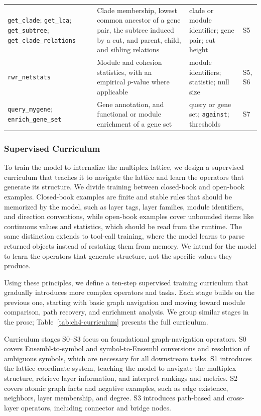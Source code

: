 \begin{table}[htb!]
\begin{tabularx}{\textwidth}{@{}>{\raggedright\arraybackslash}p{} Y >{\raggedright\arraybackslash}p{0.175\textwidth} >{\centering\arraybackslash}p{0.055\textwidth}@{}}
\addlinespace
\texttt{get\_clade}; \texttt{get\_lca}; \texttt{get\_subtree}; \texttt{get\_clade\_relations}
  & Clade membership, lowest common ancestor of a gene pair, the subtree induced by a cut, and parent, child, and sibling relations
  & clade or module identifier; gene pair; cut height & S5 \\
\addlinespace
\texttt{rwr\_netstats}
  & Module and cohesion statistics, with an empirical $p$-value where applicable
  & module identifiers; statistic; null size & S5, S6 \\
\addlinespace
\texttt{query\_mygene}; \texttt{enrich\_gene\_set}
  & Gene annotation, and functional or module enrichment of a gene set
  & query or gene set; \texttt{against}; thresholds & S7 \\
\bottomrule
\end{tabularx}
\end{table}

\subsubsection{Supervised Curriculum}\label{sec:ch4-curriculum}
To train the model to internalize the multiplex lattice, we design a supervised curriculum that teaches it to navigate the lattice and learn the operators that generate its structure. We divide training between closed-book and open-book examples. Closed-book examples are finite and stable rules that should be memorized by the model, such as layer tags, layer families, module identifiers, and direction conventions, while open-book examples cover unbounded items like continuous values and statistics, which should be read from the runtime. The same distinction extends to tool-call training, where the model learns to parse returned objects instead of restating them from memory. We intend for the model to learn the operators that generate structure, not the specific values they produce.

Using these principles, we define a ten-step supervised training curriculum that gradually introduces more complex operators and tasks. Each stage builds on the previous one, starting with basic graph navigation and moving toward module comparison, path recovery, and enrichment analysis. We group similar stages in the prose; Table~\ref{tab:ch4-curriculum} presents the full curriculum.

Curriculum stages S0--S3 focus on foundational graph-navigation operators. S0 covers Ensembl-to-symbol and symbol-to-Ensembl conversions and resolution of ambiguous symbols, which are necessary for all downstream tasks. S1 introduces the lattice coordinate system, teaching the model to navigate the multiplex structure, retrieve layer information, and interpret rankings and metrics. S2 covers atomic graph facts and negative examples, such as edge existence, neighbors, layer membership, and degree. S3 introduces path-based and cross-layer operators, including connector and bridge nodes.

